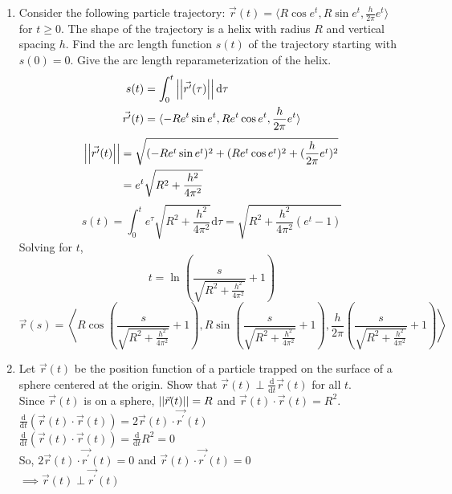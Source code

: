 \begin{enumerate}
	\item Consider the following particle trajectory: $\vec{r}(t) = \langle R\cos{e^t}, R\sin{e^t}, \frac{h}{2\pi}e^t \rangle$ for $t \geq 0$. The shape of the trajectory is a helix with radius $R$ and vertical spacing $h$. Find the arc length function $s(t)$ of the trajectory starting with $s(0) = 0$. Give the arc length reparameterization of the helix.
	\begin{align*}
		s(t) &= \int_{0}^{t}{\left|\left|\vec{r^\prime}(\tau)\right|\right|\mathrm{d}\tau}\\
		\vec{r^\prime}(t) &= \langle -Re^{t}\sin{e^t}, Re^{t}\cos{e^t}, \frac{h}{2\pi}e^{t} \rangle
	\end{align*}
	\begin{align*}
		\left|\left|\vec{r^\prime}(t)\right|\right| &= \sqrt{(-Re^{t}\sin{e^t})^2 + (Re^{t}\cos{e^t})^2 + (\frac{h}{2\pi}e^t)^2} \\
		&= e^{t}\sqrt{R^2 + \frac{h^2}{4\pi^2}}
	\end{align*}
	\begin{equation*}
		s(t) = \int_{0}^{t}{e^{\tau}\sqrt{R^2 + \frac{h^2}{4\pi^2}}\mathrm{d}\tau} = \sqrt{R^2 + \frac{h^2}{4\pi^2}(e^{t} - 1)}
	\end{equation*}
	Solving for $t$,
	\begin{equation*}
		t = \ln{\left(\frac{s}{\sqrt{R^2 + \frac{h^2}{4\pi^2}}} + 1\right)}	
	\end{equation*}
	\begin{equation*}
		\vec{r}(s) = \left< R\cos{\left(\frac{s}{\sqrt{R^2 + \frac{h^2}{4\pi^2}}} + 1\right)}, R\sin{\left(\frac{s}{\sqrt{R^2 + \frac{h^2}{4\pi^2}}} + 1\right)}, \frac{h}{2\pi}\left(\frac{s}{\sqrt{R^2 +\frac{h^2}{4\pi^2}}} + 1\right) \right>
	\end{equation*}
	
	\item Let $\vec{r}(t)$ be the position function of a particle trapped on the surface of a sphere centered at the origin. Show that $\vec{r}(t)\perp\frac{\mathrm{d}}{\mathrm{d}t}\vec{r}(t)$ for all $t$.\\
	\indent
	Since $\vec{r}(t)$ is on a sphere, $\left|\left|\vec{r}(t)\right|\right| = R$ and $\vec{r}(t) \cdot \vec{r}(t) = R^2$.\\
	$\frac{\mathrm{d}}{\mathrm{d}t}(\vec{r}(t) \cdot \vec{r}(t)) = 2\vec{r}(t) \cdot \vec{r^\prime}(t)$\\
	$\frac{\mathrm{d}}{\mathrm{d}t}(\vec{r}(t) \cdot \vec{r}(t)) = \frac{\mathrm{d}}{\mathrm{d}t}R^2 = 0$\\
	So, $2\vec{r}(t) \cdot \vec{r^\prime}(t) = 0$ and $\vec{r}(t) \cdot \vec{r^\prime}(t) = 0$\\
	$\implies \vec{r}(t)\perp\vec{r^\prime}(t)$\\
\end{enumerate}